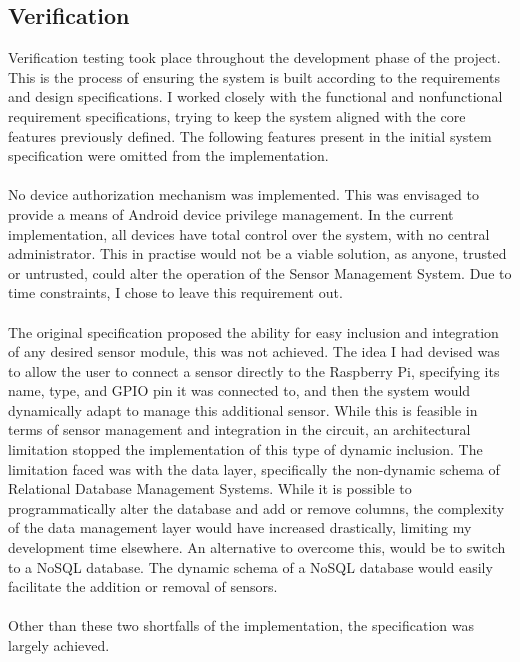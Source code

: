 \documentclass{article}
\begin{document}
\subsection{Verification}
Verification testing took place throughout the development phase of the project. This is the process of ensuring the system is built according to the requirements and design specifications. I worked closely with the functional and nonfunctional requirement specifications, trying to keep the system aligned with the core features previously defined. The following features present in the initial system specification were omitted from the implementation. \\\\
No device authorization mechanism was implemented. This was envisaged to provide a means of Android device privilege management. In the current implementation, all devices have total control over the system, with no central administrator. This in practise would not be a viable solution, as anyone, trusted or untrusted, could alter the operation of the Sensor Management System. Due to time constraints, I chose to leave this requirement out.\\\\
The original specification proposed the ability for easy inclusion and integration of any desired sensor module, this was not achieved. The idea I had devised was to allow the user to connect a sensor directly to the Raspberry Pi, specifying its name, type, and GPIO pin it was connected to, and then the system would dynamically adapt to manage this additional sensor. While this is feasible in terms of sensor management and integration in the circuit, an architectural limitation stopped the implementation of this type of dynamic inclusion. The limitation faced was with the data layer, specifically the non-dynamic schema of Relational Database Management Systems. While it is possible to programmatically alter the database and add or remove columns, the complexity of the data management layer would have increased drastically, limiting my development time elsewhere. An alternative to overcome this, would be to switch to a NoSQL database. The dynamic schema of a NoSQL database would easily facilitate the addition or removal of sensors. \\\\
Other than these two shortfalls of the implementation, the specification was largely achieved. 
\end{document}
